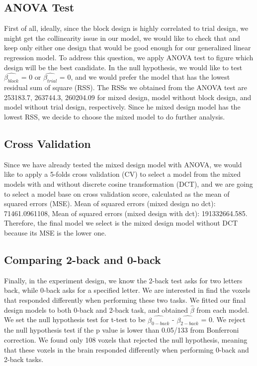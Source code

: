 \subsection{ANOVA Test}

First of all, ideally, since the block design is highly correlated to trial 
design, we might get the collinearity issue in our model, we would like to check
that and keep only either one design that would be good enough for our generalized 
linear regression model. To address this question, we apply ANOVA test to figure which
design will be the best candidate. In the null hypothesis, we would like to test 
$\widehat{\beta_{block}}$ = 0 or $\widehat{\beta_{trial}}$ = 0, and we would prefer the 
model that has the lowest residual sum of square (RSS). The RSSs we obtained from 
the ANOVA test are 253183.7, 263744.3, 260204.09 for mixed design, model without 
block design, and model without trial design, respectively. Since he mixed design model 
has the lowest RSS, we decide to choose the mixed model to do further analysis.

\subsection{Cross Validation}

Since we have already tested the mixed design model with ANOVA, we would like to 
apply a 5-folds cross validation (CV) to select a model from the mixed models with 
and without discrete cosine transformation (DCT), and we are going to select a model
base on cross validation score, calculated as the mean of squared errors (MSE). 
Mean of squared errors (mixed design no dct): 71461.0961108, 
Mean of squared errors (mixed design with dct): 191332664.585. 
Therefore, the final model we select is the mixed design model without DCT 
because its MSE is the lower one. 

\subsection{Comparing 2-back and 0-back}

Finally, in the experiment design, we know the 2-back test asks for two letters back, 
while 0-back asks for a specified letter. We are interested in find the voxels that responded 
differently when performing these two tasks. We fitted our final design models to 
both 0-back and 2-back task, and obtained $\hat{\beta}$ from each model. We set the null 
hypothesis test for t-test to be $\widehat{\beta_{0-back}}$ - $\widehat{\beta_{2-back}}$ = 0. 
We reject the null hypothesis test if the p value is lower than 0.05/133 from Bonferroni 
correction. We found only 108 voxels that rejected the null hypothesis, meaning that these 
voxels in the brain responded differently when performing 0-back and 2-back tasks. 
